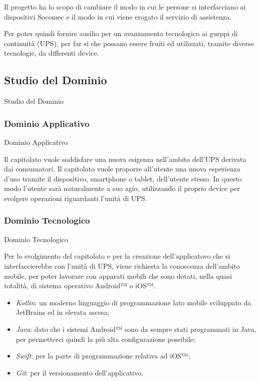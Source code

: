 \documentclass[11pt]{article}
\begin{document}
    Il progetto ha lo scopo di cambiare il modo in cui le persone si interfacciano ai dispositivi Socomec e il modo in
    cui viene erogato il servizio di assistenza.
    
    Per poter quindi fornire ausilio per un avanzamento tecnologico ai gurppi di continuità (UPS), per far si che possano essere fruiti ed utilizzati, tramite diverse tecnologie, da differenti device.
    
    
    \subsection{Studio del Dominio} Studio del Dominio
        \subsubsection{Dominio Applicativo} Dominio Applicativo
        
        Il capitolato vuole soddisfare una nuova esigenza nell'ambito dell'UPS derivata dai consumatori.
        Il capitolato vuole proporre all’utente una nuova esperienza d’uso tramite il dispositivo, smartphone o
        tablet, dell’utente stesso.
        In questo modo l’utente sarà naturalmente a suo agio, utilizzando il proprio device per svolgere operazioni riguardanti l'unità di UPS.
        \subsubsection{Dominio Tecnologico} Dominio Tecnologico
        
        Per lo svolgimento del capitolato e per la creazione dell'applicatovo che si interfaccierebbe con l'unità di UPS, viene richiesta la conoscenza dell'ambito mobile, per poter lavorare con apparati mobili che sono dotati, nella quasi totalità, di sistema operativo Android™ o iOS™.
        \begin{itemize}
            \item \textit{Kotlin}: un moderno linguaggio di programmazione lato mobile sviluppato da JetBrains ed in elevata ascesa;
            \item \textit{Java}: dato che i sistemi Android™ sono da sempre stati programmati in Java, per permetterci quindi la più alta configurazione possibile;
            \item \textit{Swift}: per la parte di programmazione relativa ad iOS™;
            \item \textit{Git}: per il versionamento dell'applicativo.
        \end{itemize}
    
\end{document}
